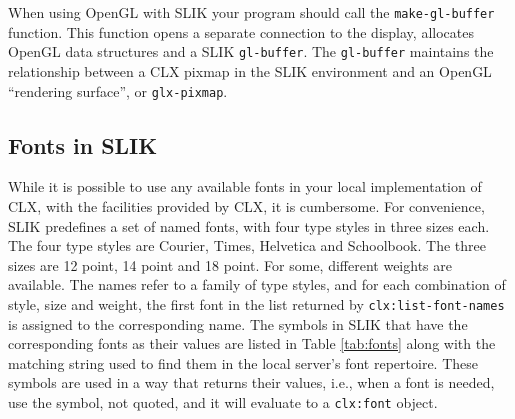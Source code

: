 \documentclass[twoside,openright,11pt]{report}
\newcommand{\tp}[1]{\texttt{#1}}
\begin{document}
When using OpenGL with SLIK your program should call the
\tp{make-gl-buffer} function.  This function opens a separate
connection to the display, allocates OpenGL data structures and a SLIK
\tp{gl-buffer}.  The \tp{gl-buffer} maintains the relationship between
a CLX pixmap in the SLIK environment and an OpenGL ``rendering
surface'', or \tp{glx-pixmap}.

\subsection{Fonts in SLIK} 

While it is possible to use any available fonts in your local
implementation of CLX, with the facilities provided by CLX, it is
cumbersome.  For convenience, SLIK predefines a set of named fonts,
with four type styles in three sizes each.  The four type styles are
Courier, Times, Helvetica and Schoolbook.  The three sizes are 12
point, 14 point and 18 point.  For some, different weights are
available.  The names refer to a family of type styles, and for each
combination of style, size and weight, the first font in the list
returned by \tp{clx:list-font-names} is assigned to the corresponding
name.  The symbols in SLIK that have the corresponding fonts as their
values are listed in Table \ref{tab:fonts} along with the matching
string used to find them in the local server's font repertoire.  These
symbols are used in a way that returns their values, i.e., when a font
is needed, use the symbol, not quoted, and it will evaluate to a
\tp{clx:font} object.

 
  
 
 
 
 
 
\end{document}

